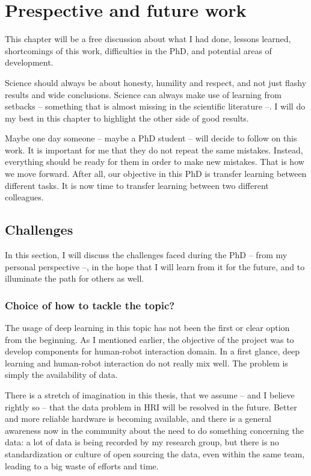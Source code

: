 \chapter{Prespective and future work} \label{ch:discussion}
\minitoc%

This chapter will be a free discussion about what I had done, lessons learned, shortcomings of this work, difficulties in the PhD, and potential areas of development.

Science should always be about honesty, humility and respect, and not just flashy results and wide conclusions. Science can always make use of learning from setbacks -- something that is almost missing in the scientific literature --. I will do my best in this chapter to highlight the other side of good results.

Maybe one day someone -- maybe a PhD student -- will decide to follow on this work. It is important for me that they do not repeat the same mistakes. Instead, everything should be ready for them in order to make new mistakes. That is how we move forward. After all, our objective in this PhD is transfer learning between different tasks. It is now time to transfer learning between two different colleagues.

\clearpage

\section{Challenges}
  \par In this section, I will discuss the challenges faced during the PhD -- from my personal perspective --, in the hope that I will learn from it for the future, and to illuminate the path for others as well.

  \subsection{Choice of how to tackle the topic?}
  \par The usage of deep learning in this topic has not been the first or clear option from the beginning. As I mentioned earlier, the objective of the project was to develop components for human-robot interaction domain. In a first glance, deep learning and human-robot interaction do not really mix well. The problem is simply the availability of data.

  \par There is a stretch of imagination in this thesis, that we assume -- and I believe rightly so -- that the data problem in HRI will be resolved in the future. Better and more reliable hardware is becoming available, and there is a general awareness now in the community about the need to do something concerning the data: a lot of data is being recorded by my research group, but there is no standardization or culture of open sourcing the data, even within the same team, leading to a big waste of efforts and time.

